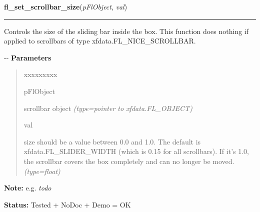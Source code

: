 \hspace{.8\funcindent}\begin{boxedminipage}{\funcwidth}

    \raggedright \textbf{fl\_set\_scrollbar\_size}(\textit{pFlObject}, \textit{val})

    \vspace{-1.5ex}

    \rule{\textwidth}{0.5\fboxrule}
\setlength{\parskip}{2ex}

Controls the size of the sliding bar inside the box. This function
does nothing if applied to scrollbars of type xfdata.FL\_NICE\_SCROLLBAR.

-{}-
\setlength{\parskip}{1ex}
      \textbf{Parameters}
      \vspace{-1ex}

      \begin{quote}
        \begin{Ventry}{xxxxxxxxx}

          \item[pFlObject]


scrollbar object
            {\it (type=pointer to xfdata.FL\_OBJECT)}

          \item[val]


size should be a value between 0.0 and 1.0. The default is
xfdata.FL\_SLIDER\_WIDTH (which is 0.15 for all scrollbars). If it's 1.0,
the scrollbar covers the box completely and can no longer be moved.
            {\it (type=float)}

        \end{Ventry}

      \end{quote}

\textbf{Note:} 
e.g. \emph{todo}


\textbf{Status:} 
Tested + NoDoc + Demo = OK


    \end{boxedminipage}

    \label{xformslib:flscrollbar:fl_set_scrollbar_increment}

    \vspace{0.5ex}

